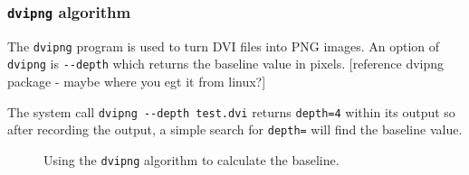 \documentclass[]{article}
\begin{document}
\subsubsection{\texorpdfstring{\texttt{dvipng}
algorithm}{dvipng algorithm}}\label{dvipng-algorithm}

The \texttt{dvipng} program is used to turn DVI files into PNG images.
An option of \texttt{dvipng} is \texttt{-\/-depth} which returns the
baseline value in pixels. {[}reference dvipng package - maybe where you
egt it from linux?{]}

The system call \texttt{dvipng\ -\/-depth\ test.dvi} returns
\texttt{depth=4} within its output so after recording the output, a
simple search for \texttt{depth=} will find the baseline value.

\begin{figure}
\begin{adjustwidth}{0.5in}{0in}
 \vspace{0.3cm}
 \vspace{0.3cm}
 \vspace{0.3cm}
 \vspace{0.3cm}
 \vspace{0.3cm}
 \vspace{0.3cm}
 \vspace{0.3cm}
 \vspace{0.3cm}
 \vspace{0.3cm}
 \vspace{0.3cm}
 \vspace{0.3cm}
 \vspace{0.3cm}
 \end{adjustwidth}
\caption{Using the \texttt{dvipng} algorithm to calculate the baseline.}
\end{figure}
\end{document}
